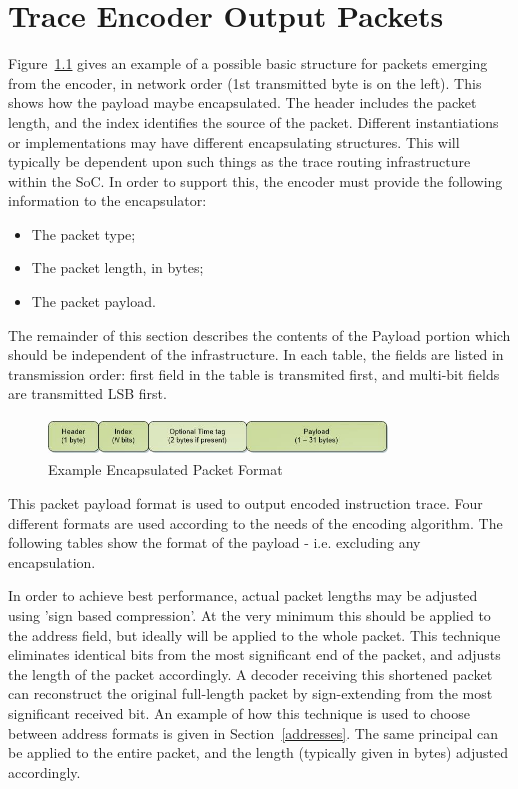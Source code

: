 \chapter{Trace Encoder Output Packets} \label{packets}

Figure~\ref{fig:packet-format} gives an example of a possible basic structure for 
packets emerging from the encoder, in network order (1st transmitted byte is on the left).
This shows how the payload maybe encapsulated.  The header includes the packet length, and 
the index identifies the source of the packet.  
Different instantiations or implementations may have different encapsulating structures.  
This will typically be dependent upon such things as the trace routing infrastructure within the 
SoC.  In order to support this, the encoder must provide the following information to the encapsulator:

\begin{itemize}
  \item The packet type;
  \item The packet length, in bytes;
  \item The packet payload.
\end{itemize}

The remainder of this section describes the contents of the Payload
portion which should be independent of the infrastructure.  In each table, the fields are listed in
transmission order: first field in the table is transmited first, and multi-bit fields are 
transmitted LSB first.

\begin{figure}[h]
\begin{center}
  \includegraphics[height=1cm, width=9cm]{newPacket.jpg}
  \caption{Example Encapsulated Packet Format}
  \label{fig:packet-format}
\end{center}
\end{figure}


This packet payload format is used to output encoded instruction
trace.  Four different formats are used according to the needs of the
encoding algorithm. The following tables show the format of the
payload - i.e. excluding any encapsulation.

In order to achieve best performance, actual packet lengths may be adjusted using 'sign based compression'.
At the very minimum this should be applied to the address field, but ideally will be applied to the whole 
packet.  This technique eliminates identical bits from the most significant end of the packet, and adjusts
the length of the packet accordingly.  A decoder receiving this shortened packet can reconstruct the 
original full-length packet by sign-extending from the most significant received bit.  An example of how
this technique is used to choose between address formats is given in Section~\ref{addresses}.  The same
principal can be applied to the entire packet, and the length (typically given in bytes) adjusted 
accordingly.

